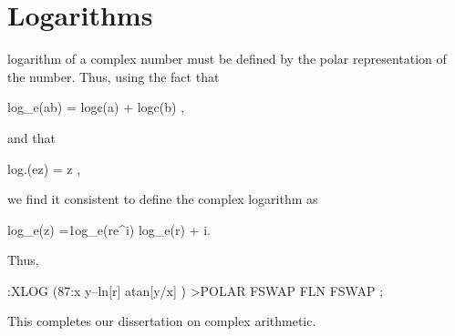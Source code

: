 \section{Logarithms}
 logarithm of a complex number must be defined by the polar representation of the number. Thus, using the fact that

log_e(ab) = log¢(a) + logc(b) ,

and that

log.(ez) = z ,

we find it consistent to define the complex logarithm as

log_e(z) =1og_e(re^{i\theta}) \equiv log_e(r) + i\theta.

Thus,

:XLOG (87:x y--ln[r] atan[y/x] )
    >POLAR FSWAP FLN FSWAP ;

This completes our dissertation on complex arithmetic.